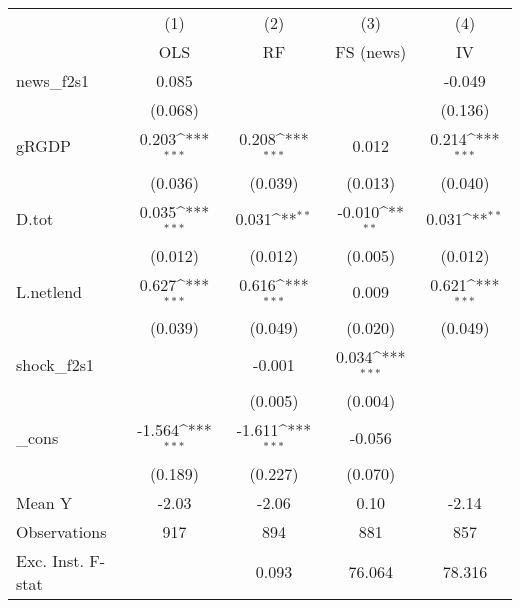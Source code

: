 {
\def\sym#1{\ifmmode^{#1}\else\(^{#1}\)\fi}
\begin{tabular}{l*{4}{c}}
\toprule
            &\multicolumn{1}{c}{(1)}&\multicolumn{1}{c}{(2)}&\multicolumn{1}{c}{(3)}&\multicolumn{1}{c}{(4)}\\
            &\multicolumn{1}{c}{OLS}&\multicolumn{1}{c}{RF}&\multicolumn{1}{c}{FS (news)}&\multicolumn{1}{c}{IV}\\
\midrule
news\_f2s1   &       0.085         &                     &                     &      -0.049         \\
            &     (0.068)         &                     &                     &     (0.136)         \\
\addlinespace
gRGDP       &       0.203\sym{***}&       0.208\sym{***}&       0.012         &       0.214\sym{***}\\
            &     (0.036)         &     (0.039)         &     (0.013)         &     (0.040)         \\
\addlinespace
D.tot       &       0.035\sym{***}&       0.031\sym{**} &      -0.010\sym{**} &       0.031\sym{**} \\
            &     (0.012)         &     (0.012)         &     (0.005)         &     (0.012)         \\
\addlinespace
L.netlend   &       0.627\sym{***}&       0.616\sym{***}&       0.009         &       0.621\sym{***}\\
            &     (0.039)         &     (0.049)         &     (0.020)         &     (0.049)         \\
\addlinespace
shock\_f2s1  &                     &      -0.001         &       0.034\sym{***}&                     \\
            &                     &     (0.005)         &     (0.004)         &                     \\
\addlinespace
\_cons      &      -1.564\sym{***}&      -1.611\sym{***}&      -0.056         &                     \\
            &     (0.189)         &     (0.227)         &     (0.070)         &                     \\
\midrule
Mean Y      &       -2.03         &       -2.06         &        0.10         &       -2.14         \\
Observations&         917         &         894         &         881         &         857         \\
Exc. Inst. F-stat&                     &       0.093         &      76.064         &      78.316         \\
\bottomrule
\end{tabular}
}
